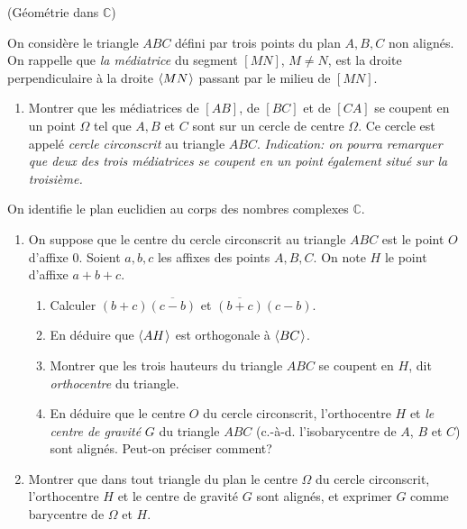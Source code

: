 \documentclass[a4paper,12pt,reqno]{amsart}
\begin{document}
\tsvp

\begin{exo} (Géométrie dans $\mathbb{C}$)

  On considère le triangle $ABC$ défini par trois points du plan $A,B,C$ non alignés. On rappelle que \emph{la médiatrice} du segment $[MN]$, $M\neq N$, est la droite perpendiculaire à la droite $\langle{MN}\kern.07em\rangle$ passant par le milieu de $[MN]$.

  \begin{enumerate}
    \item Montrer que les médiatrices de $[AB]$, de $[BC]$ et de $[CA]$ se coupent en un point $\Omega$ tel que $A, B$ et $C$ sont sur un cercle de centre $\Omega$. Ce cercle est appelé \emph{cercle circonscrit} au triangle $ABC$.\newline
    \emph{Indication: on pourra remarquer que deux des trois médiatrices se coupent en un point également situé sur la troisième.}
  \end{enumerate}

  On identifie le plan euclidien au corps des nombres complexes $\mathbb{C}$.

  \begin{enumerate}[resume]
    \item On suppose que le centre du cercle circonscrit au triangle $ABC$ est le point $O$ d'affixe $0$. Soient $a,b,c$ les affixes des points $A,B,C$. On note $H$ le point d'affixe $a+b+c$.
    \begin{enumerate}
      \item Calculer $(b+c)\overline{(c-b)}$ et $\overline{(b+c)}(c-b)$.
      \item En déduire que $\langle{AH}\kern.07em\rangle$ est orthogonale à $\langle{BC}\kern.07em\rangle$.
      \item Montrer que les trois hauteurs du triangle $ABC$ se coupent en $H$, dit \emph{orthocentre} du triangle.
      \item En déduire que le centre $O$ du cercle circonscrit, l'orthocentre $H$ et \emph{le centre de gravité} $G$ du triangle $ABC$ (c.-à-d. l'isobarycentre de $A$, $B$ et $C$) sont alignés. Peut-on préciser comment?
    \end{enumerate}
    \item Montrer que dans tout triangle du plan le centre $\Omega$ du cercle circonscrit, l'orthocentre $H$ et le centre de gravité $G$ sont alignés, et exprimer $G$ comme barycentre de $\Omega$ et $H$.
  \end{enumerate}
\end{exo}
\end{document}
